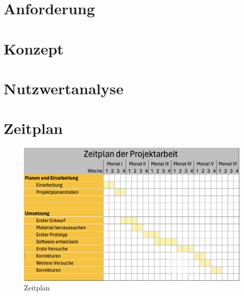 \section{Anforderung}
\section{Konzept}
\section{Nutzwertanalyse}
\section{Zeitplan}
\begin{figure}[hbt]
\centering
\includegraphics[width=0.9\linewidth]{images/Zeitplan}
\caption[Zeitplan]{ Zeitplan}
\label{fig:Zeitplan}
\end{figure}